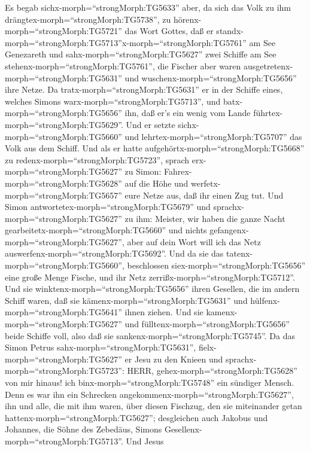  Es begab sichx-morph=``strongMorph:TG5633'' aber, da sich
das Volk zu ihm drängtex-morph=``strongMorph:TG5738'', zu
hörenx-morph=``strongMorph:TG5721'' das Wort Gottes, daß er
standx-morph=``strongMorph:TG5713''x-morph=``strongMorph:TG5761'' am See
Genezareth  und sahx-morph=``strongMorph:TG5627'' zwei
Schiffe am See stehenx-morph=``strongMorph:TG5761'', die Fischer aber
waren ausgetretenx-morph=``strongMorph:TG5631'' und
wuschenx-morph=``strongMorph:TG5656'' ihre Netze.  Da
tratx-morph=``strongMorph:TG5631'' er in der Schiffe eines, welches
Simons warx-morph=``strongMorph:TG5713'', und
batx-morph=``strongMorph:TG5656'' ihn, daß er's ein wenig vom Lande
führtex-morph=``strongMorph:TG5629''. Und er setzte
sichx-morph=``strongMorph:TG5660'' und
lehrtex-morph=``strongMorph:TG5707'' das Volk aus dem Schiff.
 Und als er hatte aufgehörtx-morph=``strongMorph:TG5668'' zu
redenx-morph=``strongMorph:TG5723'', sprach
erx-morph=``strongMorph:TG5627'' zu Simon:
Fahrex-morph=``strongMorph:TG5628'' auf die Höhe und
werfetx-morph=``strongMorph:TG5657'' eure Netze aus, daß ihr einen Zug
tut.  Und Simon antwortetex-morph=``strongMorph:TG5679'' und
sprachx-morph=``strongMorph:TG5627'' zu ihm: Meister, wir haben die
ganze Nacht gearbeitetx-morph=``strongMorph:TG5660'' und nichts
gefangenx-morph=``strongMorph:TG5627'', aber auf dein Wort will ich das
Netz auswerfenx-morph=``strongMorph:TG5692''.  Und da sie
das tatenx-morph=``strongMorph:TG5660'', beschlossen
siex-morph=``strongMorph:TG5656'' eine große Menge Fische, und ihr Netz
zerrißx-morph=``strongMorph:TG5712''.  Und sie
winktenx-morph=``strongMorph:TG5656'' ihren Gesellen, die im andern
Schiff waren, daß sie kämenx-morph=``strongMorph:TG5631'' und
hülfenx-morph=``strongMorph:TG5641'' ihnen ziehen. Und sie
kamenx-morph=``strongMorph:TG5627'' und
fülltenx-morph=``strongMorph:TG5656'' beide Schiffe voll, also daß sie
sankenx-morph=``strongMorph:TG5745''.  Da das Simon Petrus
sahx-morph=``strongMorph:TG5631'', fielx-morph=``strongMorph:TG5627'' er
Jesu zu den Knieen und sprachx-morph=``strongMorph:TG5723'': HERR,
gehex-morph=``strongMorph:TG5628'' von mir hinaus! ich
binx-morph=``strongMorph:TG5748'' ein sündiger Mensch.  Denn
es war ihn ein Schrecken angekommenx-morph=``strongMorph:TG5627'', ihn
und alle, die mit ihm waren, über diesen Fischzug, den sie miteinander
getan hattenx-morph=``strongMorph:TG5627'';  desgleichen
auch Jakobus und Johannes, die Söhne des Zebedäus, Simons
Gesellenx-morph=``strongMorph:TG5713''. Und Jesus
